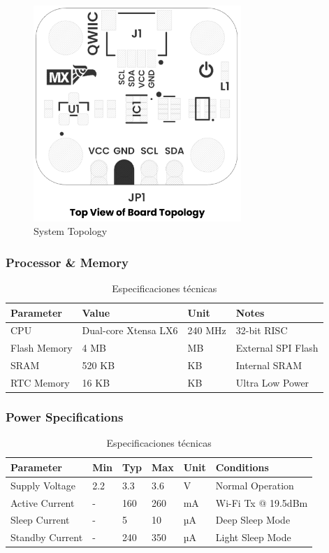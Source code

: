 \documentclass[11pt,a4paper]{article}
\begin{document}
\begin{figure}[H]
\centering
\includegraphics[width=0.7\textwidth]{en_unit_topology_v_1_0_0_icp10111_barometric_pressure_sensor.png}
\caption{System Topology}
\label{fig:en-unit-topology-v-1-0-0-icp10111-barometric-pressure-sensor-png}
\end{figure}



\subsubsection{Processor & Memory}


\begin{table}[H]
\centering
\small
\begin{tabular}{|l|l|l|l|}
\hline
Parameter & Value & Unit & Notes \\
\hline
CPU & Dual-core Xtensa LX6 & 240 MHz & 32-bit RISC \\
Flash Memory & 4 MB & MB & External SPI Flash \\
SRAM & 520 KB & KB & Internal SRAM \\
RTC Memory & 16 KB & KB & Ultra Low Power \\
\hline
\end{tabular}
\caption{Especificaciones técnicas}
\end{table}


\subsubsection{Power Specifications}


\begin{table}[H]
\centering
\small
\begin{tabular}{|l|l|l|l|l|l|}
\hline
Parameter & Min & Typ & Max & Unit & Conditions \\
\hline
Supply Voltage & 2.2 & 3.3 & 3.6 & V & Normal Operation \\
Active Current & - & 160 & 260 & mA & Wi-Fi Tx @ 19.5dBm \\
Sleep Current & - & 5 & 10 & µA & Deep Sleep Mode \\
Standby Current & - & 240 & 350 & µA & Light Sleep Mode \\
\hline
\end{tabular}
\caption{Especificaciones técnicas}
\end{table}
\end{document}
